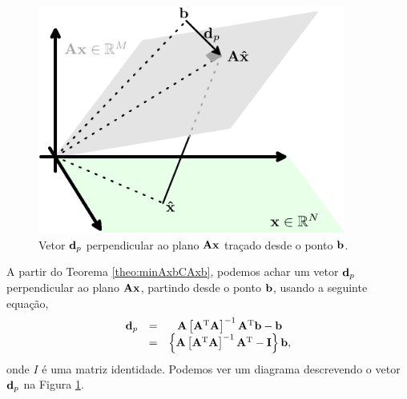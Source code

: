 \begin{corollaryT} 
\label{coro:minAxbCAxb1} ~

\noindent
\begin{minipage}{0.49\textwidth}
     \begin{figure}[H]
         \centering
         \includegraphics[width=0.9\textwidth]{chapters/minimization-fx/minimo-linear1.eps}
         \caption{Vetor $\VECTOR{d}_p$ perpendicular ao plano 
$\MATRIX{A}\VECTOR{x}$ traçado desde o ponto $\VECTOR{b}$. }
         \label{fig:coro:minAxbCAxb1:a}
     \end{figure}
\end{minipage}
\begin{minipage}{0.49\textwidth}
A partir do Teorema \ref{theo:minAxbCAxb}, 
podemos achar um vetor $\VECTOR{d}_p$ perpendicular ao plano $\MATRIX{A}\VECTOR{x}$,
partindo desde o ponto $\VECTOR{b}$, usando a seguinte equação,
\begin{equation}
\begin{matrix}
\VECTOR{d}_p & = & \MATRIX{A}\left[ \MATRIX{A}^{\transpose}\MATRIX{A} \right]^{-1}\MATRIX{A}^{\transpose}\VECTOR{b}- \VECTOR{b}\\
~            & = & \left\{\MATRIX{A}\left[ \MATRIX{A}^{\transpose}\MATRIX{A} \right]^{-1}\MATRIX{A}^{\transpose}- \MATRIX{I}\right\}\VECTOR{b},
\end{matrix}
\end{equation}
onde $I$ é uma matriz identidade.
Podemos ver um diagrama descrevendo o vetor $\VECTOR{d}_p$ na Figura \ref{fig:coro:minAxbCAxb1:a}.
\end{minipage}
\end{corollaryT}

